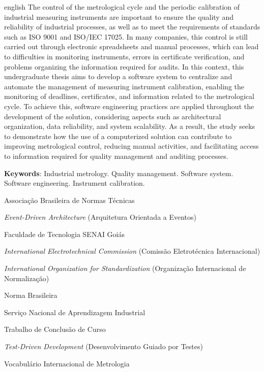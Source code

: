 \documentclass[
	12pt,       %
	oneside,    %
	a4paper,    %
	english,    %
	brazilian   %
]{abntex2}
\begin{document}
\begin{resumo}[Abstract]
 \begin{otherlanguage*}{english}
   The control of the metrological cycle and the periodic calibration of industrial measuring instruments are important to ensure the quality and reliability of industrial processes, as well as to meet the requirements of standards such as ISO 9001 and ISO/IEC 17025. In many companies, this control is still carried out through electronic spreadsheets and manual processes, which can lead to difficulties in monitoring instruments, errors in certificate verification, and problems organizing the information required for audits. In this context, this undergraduate thesis aims to develop a software system to centralize and automate the management of measuring instrument calibration, enabling the monitoring of deadlines, certificates, and information related to the metrological cycle. To achieve this, software engineering practices are applied throughout the development of the solution, considering aspects such as architectural organization, data reliability, and system scalability. As a result, the study seeks to demonstrate how the use of a computerized solution can contribute to improving metrological control, reducing manual activities, and facilitating access to information required for quality management and auditing processes.

   \textbf{Keywords}: Industrial metrology. Quality management. Software system. Software engineering. Instrument calibration.
 \end{otherlanguage*}
\end{resumo}

\listoffigures*
\cleardoublepage

\listoftables*
\cleardoublepage

\begin{siglas}
  \item[ABNT] Associação Brasileira de Normas Técnicas
  \item[EDA] \textit{Event-Driven Architecture} (Arquitetura Orientada a Eventos)
  \item[FATESG] Faculdade de Tecnologia SENAI Goiás
  \item[IEC] \textit{International Electrotechnical Commission} (Comissão Eletrotécnica Internacional)
  \item[ISO] \textit{International Organization for Standardization} (Organização Internacional de Normalização)
  \item[NBR] Norma Brasileira
  \item[SENAI] Serviço Nacional de Aprendizagem Industrial
  \item[TCC] Trabalho de Conclusão de Curso
  \item[TDD] \textit{Test-Driven Development} (Desenvolvimento Guiado por Testes)
  \item[VIM] Vocabulário Internacional de Metrologia
\end{siglas}
\end{document}
